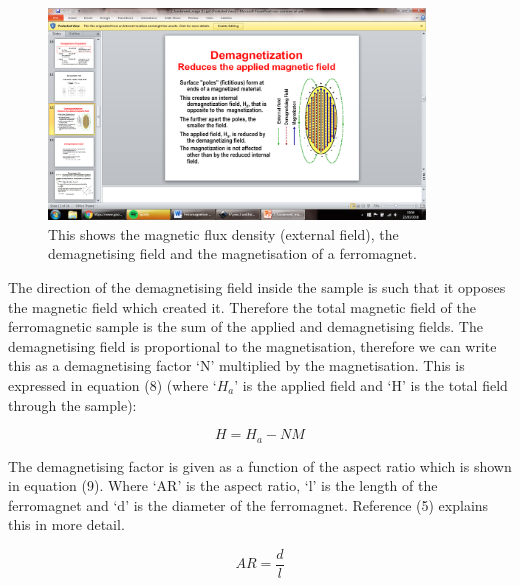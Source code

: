 \documentclass[a4paper]{article}\usepackage[english]{babel}
\begin{document}
\begin{figure}
\includegraphics[trim=810 200 300 250,clip,width=10cm,clip,width=\linewidth]{picture6.png}
\caption{\label{fig:picture6}This shows the magnetic flux density (external field), the demagnetising field and the magnetisation of a ferromagnet.}
\end{figure}
\FloatBarrier
The direction of the demagnetising field inside the sample is such that it opposes the magnetic field which created it. Therefore the total magnetic field of the ferromagnetic sample is the sum of the applied and demagnetising fields. The demagnetising field is proportional to the magnetisation, therefore we can write this as a demagnetising factor ‘N’ multiplied by the magnetisation. This is expressed in equation (8) (where ‘$H_a$’ is the applied field and ‘H’ is the total field through the sample):

\begin{equation}\label{my_eighth_equation}
H=H_a-NM
\end{equation}

The demagnetising factor is given as a function of the aspect ratio which is shown in equation (9). Where ‘AR’ is the aspect ratio, ‘l’ is the length of the ferromagnet and ‘d’ is the diameter of the ferromagnet. Reference (5) explains this in more detail.

\begin{equation}\label{my_ninth_equation}
AR=\frac{d}{l}
\end{equation}
\end{document}
